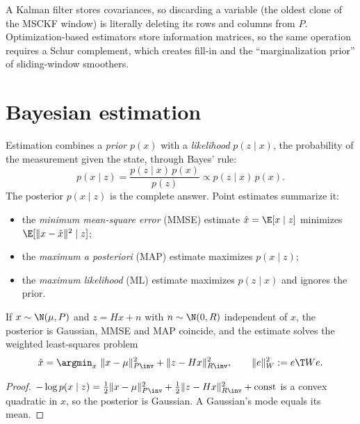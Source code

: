 \begin{keyidea}
A Kalman filter stores covariances, so discarding a variable (the oldest clone of the MSCKF window)
is literally deleting its rows and columns from $P$. Optimization-based estimators store
information matrices, so the same operation requires a Schur complement, which creates fill-in and
the ``marginalization prior'' of sliding-window smoothers.
\end{keyidea}

\section{Bayesian estimation}

Estimation combines a \emph{prior} $p(x)$ with a \emph{likelihood} $p(z\mid x)$, the probability
of the measurement given the state, through Bayes' rule:
\begin{equation}
  p(x \mid z) = \frac{p(z\mid x)\, p(x)}{p(z)} \propto p(z \mid x)\, p(x).
\end{equation}
The posterior $p(x\mid z)$ is the complete answer. Point estimates summarize it:
\begin{itemize}
  \item the \emph{minimum mean-square error} (MMSE) estimate $\hat x = \E[x \mid z]$ minimizes
        $\E[\|x - \hat x\|^2 \mid z]$;
  \item the \emph{maximum a posteriori} (MAP) estimate maximizes $p(x \mid z)$;
  \item the \emph{maximum likelihood} (ML) estimate maximizes $p(z\mid x)$ and ignores the prior.
\end{itemize}

\begin{proposition}
\label{prop:map-ls}
If $x \sim \N(\mu, P)$ and $z = Hx + n$ with $n \sim \N(0, R)$ independent of $x$, the posterior is
Gaussian, MMSE and MAP coincide, and the estimate solves the weighted least-squares problem
\begin{equation}
  \hat x = \argmin_x\ \|x - \mu\|^2_{P\inv} + \|z - Hx\|^2_{R\inv},
  \qquad \|e\|^2_{W} := e\T W e.
  \label{eq:map-ls}
\end{equation}
\end{proposition}
\begin{proof}
$-\log p(x\mid z) = \tfrac12\|x - \mu\|^2_{P\inv} + \tfrac12\|z - Hx\|^2_{R\inv} + \text{const}$
is a convex quadratic in $x$, so the posterior is Gaussian. A Gaussian's mode equals its mean.
\end{proof}

